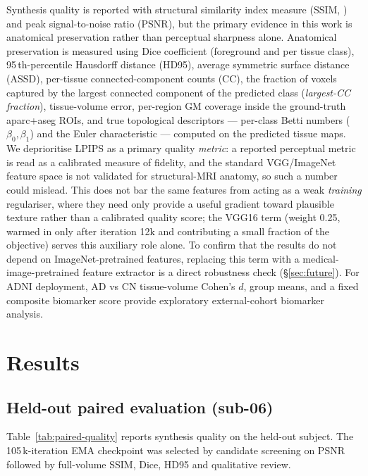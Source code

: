 \documentclass[10pt,twocolumn,a4paper]{article}
\begin{document}
Synthesis quality is reported with structural similarity index measure
(SSIM, \cite{wang2004image}) and peak signal-to-noise ratio (PSNR), but
the primary evidence in this work is anatomical preservation rather
than perceptual sharpness alone. Anatomical preservation is measured
using Dice coefficient (foreground and per tissue class),
95\,th-percentile Hausdorff distance (HD95), average symmetric surface
distance (ASSD), per-tissue connected-component counts (CC), the
fraction of voxels captured by the largest connected component of the
predicted class (\emph{largest-CC fraction}), tissue-volume error,
per-region GM coverage inside the ground-truth aparc+aseg ROIs, and
true topological descriptors --- per-class Betti numbers
($\beta_0,\beta_1$) and the Euler characteristic --- computed on the
predicted tissue maps. We deprioritise LPIPS as a primary quality \emph{metric}: a reported
perceptual metric is read as a calibrated measure of fidelity, and the
standard VGG/ImageNet feature space is not validated for structural-MRI
anatomy, so such a number could mislead. This does not bar the same
features from acting as a weak \emph{training} regulariser, where they
need only provide a useful gradient toward plausible texture rather than
a calibrated quality score; the VGG16 term (weight 0.25, warmed in only
after iteration 12k and contributing a small fraction of the objective)
serves this auxiliary role alone. To confirm that the results do not
depend on ImageNet-pretrained features, replacing this term with a
medical-image-pretrained feature extractor is a direct robustness check
(\S\ref{sec:future}). For ADNI deployment, AD vs CN tissue-volume Cohen's $d$,
group means, and a fixed composite biomarker score
\cite{jack2018niaaa} provide exploratory external-cohort biomarker
analysis.

\section{Results}
\label{sec:results}

\subsection{Held-out paired evaluation (sub-06)}
\label{sec:res-paired}

Table~\ref{tab:paired-quality} reports synthesis quality on the
held-out subject. The 105\,k-iteration EMA checkpoint was selected by
candidate screening on PSNR followed by full-volume SSIM, Dice, HD95
and qualitative review.
\end{document}
